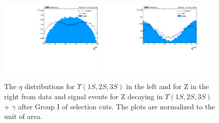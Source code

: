 \begin{figure}[!htbp]
\begin{center}
\includegraphics[width=0.45\textwidth]{figures_and_tables/outputPlots/ZtoUpsilon_Cat0_ZZZZZ/au/data_x_mc/noKinCuts/h_noKin_Upsilon_eta}\hspace*{1.cm}
\includegraphics[width=0.45\textwidth]{figures_and_tables/outputPlots/ZtoUpsilon_Cat0_ZZZZZ/au/data_x_mc/noKinCuts/h_noKin_Z_eta}
\end{center}\vspace*{-.5cm}
\caption{The $\eta$ distributions for $\Upsilon(1S,2S,3S)$ in the left and for Z in the right from data and signal events for Z decaying in $\Upsilon(1S,2S,3S)$ + $\gamma$ after Group I of selection cuts. The plots are normalized to the unit of area.}
\label{fig:etaUpsilon_and_Z_ZtoUpsilon_Cat0}
\end{figure}

